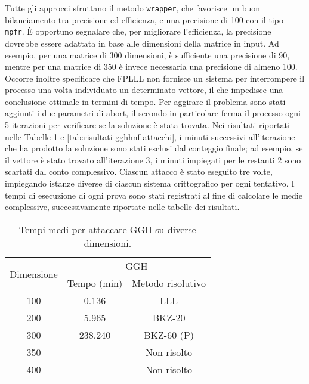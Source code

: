 Tutte gli approcci sfruttano il metodo \texttt{wrapper}, che favorisce un buon bilanciamento
tra precisione ed efficienza, e una precisione di 100 con il tipo \texttt{mpfr}. 
È opportuno segnalare che, per migliorare l'efficienza, la precisione dovrebbe essere 
adattata in base alle dimensioni della matrice in input. Ad esempio, per una 
matrice di 300 dimensioni, è sufficiente una precisione di 90, mentre per una matrice
di 350 è invece necessaria una precisione di almeno 100. Occorre inoltre specificare che
FPLLL non fornisce un sistema per interrompere il processo una volta individuato un 
determinato vettore, il che impedisce una conclusione ottimale in termini di tempo. 
Per aggirare il problema sono stati aggiunti i due parametri di abort, il secondo in particolare
ferma il processo ogni 5 iterazioni per verificare se la soluzione è stata trovata. 
Nei risultati riportati nelle Tabelle \ref{tab:risultati-ggh-attacchi} e 
\ref{tab:risultati-gghhnf-attacchi}, i minuti successivi all'iterazione che ha prodotto 
la soluzione sono stati esclusi dal conteggio finale; ad esempio, se il vettore è stato 
trovato all'iterazione 3, i minuti impiegati per le restanti 2 sono scartati dal conto complessivo.  
Ciascun attacco è stato eseguito tre volte, impiegando istanze diverse di ciascun sistema 
crittografico per ogni tentativo. I tempi di esecuzione di ogni prova sono stati 
registrati al fine di calcolare le medie complessive, successivamente riportate nelle 
tabelle dei risultati.

\begin{table}[H]
    \centering
    \begin{tabular}{|c|c|c|}
    \hline
    \multirow{2}{*}{Dimensione} & \multicolumn{2}{c|}{GGH} \\
    \cline{2-3}
     & Tempo (min) & Metodo risolutivo\\
    \hline
    100 & 0.136 & LLL \\ 
    \hline
    200 & 5.965 &  BKZ-20 \\
    \hline
    300 &  238.240 & BKZ-60 (P) \\ 
    \hline
    350 & - & Non risolto \\
    \hline
    400 & - & Non risolto \\
    \hline
    \end{tabular}
    \caption{Tempi medi per attaccare GGH su diverse dimensioni.}
    \label{tab:risultati-ggh-attacchi}
\end{table}

